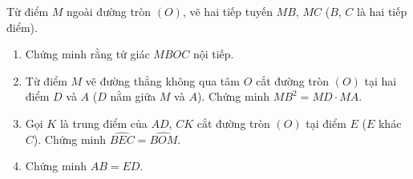\begin{ex}%
	Từ điểm $M$ ngoài đường tròn $(O)$, vẽ hai tiếp tuyến $MB$, $MC$ ($B$, $C$ là hai tiếp điểm).
	\begin{enumerate}
	\item Chứng minh rằng tứ giác $MBOC$ nội tiếp.
	\item Từ điểm $M$ vẽ đường thẳng không qua tâm $O$ cắt đường tròn $(O)$ tại hai điểm $D$ và $A$ ($D$ nằm giữa $M$ và $A$). Chứng minh $MB^2=MD\cdot MA$.
	\item Gọi $K$ là trung điểm của $AD$, $CK$ cắt đường tròn $(O)$ tại điểm $E$ ($E$ khác $C$). Chứng minh $\widehat{BEC}=\widehat{BOM}$.
	\item Chứng minh $AB=ED$.
         \end{enumerate}
\end{ex}
